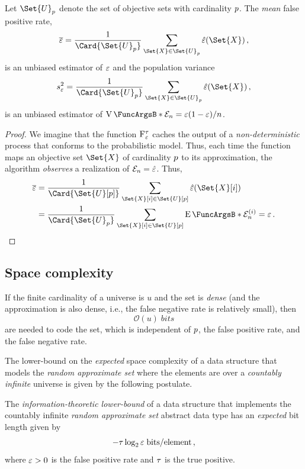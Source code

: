 \documentclass[10pt,final,hidelinks]{article}
\numberwithin{equation}{section}
\begin{document}
Let $\Set{U}_p$ denote the set of objective sets with cardinality $\p$.
The \emph{mean} false positive rate,
\begin{equation}
    \overline{\fprate} = \frac{1}{\Card{\Set{U}_p}}
        \sum_{\Set{X} \in \Set{U}_p} \fprateob(\Set{X})\,,
\end{equation}
is an unbiased estimator of $\fprate$ and the population variance
\begin{equation}
    s^2_\fprate = \frac{1}{\Card{\Set{U}_p}}
        \sum_{\Set{X} \in \Set{U}_p} \fprateob(\Set{X})\,,
\end{equation}
is an unbiased estimator of $\Var{\FPR_\n} = \fprate(1-\fprate)/\n$.
\begin{proof}
We imagine that the function $\ctor{\fprate}{\tprate}$ caches the output of a \emph{non-deterministic} process that conforms to the probabilistic model.
Thus, each time the function maps an objective set $\Set{X}$ of cardinality $\p$ to its approximation, the algorithm \emph{observes} a realization of 
$\FPR_\n = \fprateob$.
Thus,
\begin{align}
    \overline{\fprate}
        &= \frac{1}{\Card{\Set{U}[p]}} 
            \sum_{\Set{X}[i] \in \Set{U}[p]} \fprateob(\Set{X}[i])\\
        &= \frac{1}{\Card{\Set{U}_p}} 
            \sum_{\Set{X}[i] \in \Set{U}[p]} \Expect{\FPR_\n^{(i)}} = \fprate\,.
\end{align}
\end{proof}

\subsection{Space complexity}
\label{sec:space_comp}
If the finite cardinality of a universe is $u$ and the set is \emph{dense} (and the approximation is also dense, i.e., the false negative rate is relatively 
small), then
\begin{equation}
    \mathcal{O}(u) \; \si{bits}
\end{equation}
are needed to code the set, which is independent of $\p$, the false positive rate, and the false negative rate.

The lower-bound on the \emph{expected} space complexity of a data structure that models the \emph{random approximate set} where the elements are over a \emph{countably infinite} universe is given by the following postulate.
\begin{postulate}
\label{pst:approx_l_b}
The \emph{information-theoretic lower-bound} of a data structure that implements the countably infinite \emph{random approximate set} abstract data type has an \emph{expected} bit length given by
\begin{equation}
    -\tprate \log_2 \fprate \; \si{bits \per element}\,,
\end{equation}
where $\fprate > 0$ is the false positive rate and $\tprate$ is the true positive.
\end{postulate}
\end{document}
